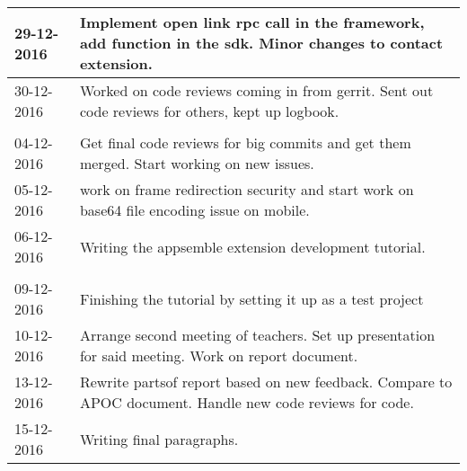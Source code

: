 \begin{tabular}{|p{2cm}|p{11cm}|}
	\hline
	29-12-2016 &  Implement open link rpc call in the framework, add function in the sdk. Minor changes to contact extension. \\ \hline
	30-12-2016 &  Worked on code reviews coming in from gerrit. Sent out code reviews for others, kept up logbook. \\ \hline
	
	\\ \hline
	
	04-12-2016 &  Get final code reviews for big commits and get them merged. Start working on new issues. \\ \hline
	05-12-2016 &  work on frame redirection security and start work on base64 file encoding issue on mobile. \\ \hline
	06-12-2016 & Writing the appsemble extension development tutorial. \\ \hline
	
	\\ \hline
	
	09-12-2016 & Finishing the tutorial by setting it up as a test project \\ \hline
	10-12-2016 & Arrange second meeting of teachers. Set up presentation for said meeting. Work on report document. \\ \hline
	13-12-2016 & Rewrite partsof report based on new feedback. Compare to APOC document. Handle new code reviews for code. \\ \hline 
	15-12-2016 & Writing final paragraphs. \\ \hline
\end{tabular}
